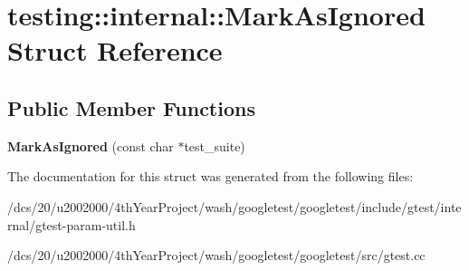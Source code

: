 \hypertarget{structtesting_1_1internal_1_1MarkAsIgnored}{}\section{testing\+:\+:internal\+:\+:Mark\+As\+Ignored Struct Reference}
\label{structtesting_1_1internal_1_1MarkAsIgnored}
\subsection*{Public Member Functions}
\begin{DoxyCompactItemize}
\item 
\mbox{\label{structtesting_1_1internal_1_1MarkAsIgnored_acbd5ecb43bac5df5e4249d4c2a6cb312}} 
{\bfseries Mark\+As\+Ignored} (const char $\ast$test\+\_\+suite)
\end{DoxyCompactItemize}


The documentation for this struct was generated from the following files\+:\begin{DoxyCompactItemize}
\item 
/dcs/20/u2002000/4th\+Year\+Project/wash/googletest/googletest/include/gtest/internal/gtest-\/param-\/util.\+h\item 
/dcs/20/u2002000/4th\+Year\+Project/wash/googletest/googletest/src/gtest.\+cc\end{DoxyCompactItemize}
